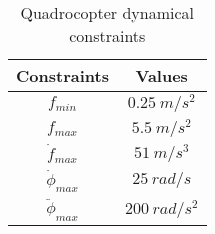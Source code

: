\begin{table}[h]
\caption{Quadrocopter dynamical constraints}
\label{table_parameters}
\begin{center}
\begin{small}
\begin{sc}
\begin{tabular}{cc}
\hline
\abovespace\belowspace
Constraints & Values \\
\hline
\abovespace
$f_{min}$ & $0.25\ m/s^2$ \\
$f_{max}$ & $5.5\ m/s^2$ \\
$\dot{f}_{max}$ & $51\ m/s^3$ \\
$\dot{\phi}_{max}$ & $25\ rad/s$ \\
$\ddot{\phi}_{max}$ & $200\ rad/s^2$ \\
\hline
\end{tabular}
\end{sc}
\end{small}
\end{center}
\vskip -0.1in
\end{table}

